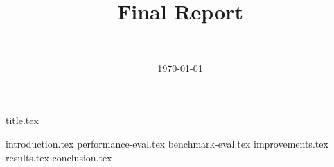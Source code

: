 \documentclass[final]{article}
\title{Final Report}
\author{~}
\date{\today}
\begin{document}

{title.tex}


\newpage

\tableofcontents
\newpage

{introduction.tex}
{performance-eval.tex}
{benchmark-eval.tex}
{improvements.tex}
{results.tex}
{conclusion.tex}
\newpage
{}

\printbibliography
\end{document}
